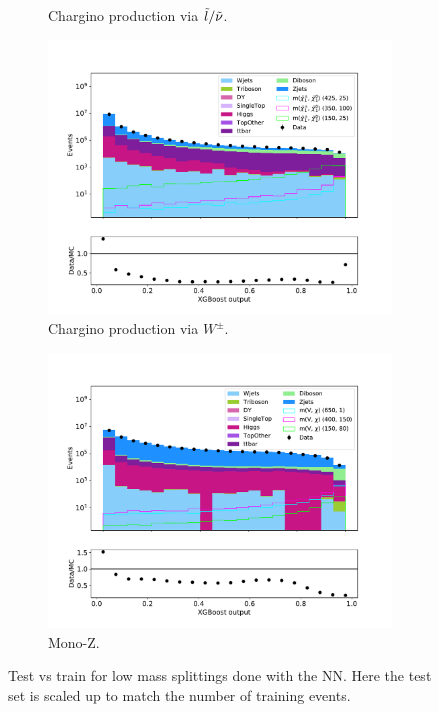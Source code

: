 \begin{figure}[H]
\begin{subfigure}[t!]{0.49\textwidth}
        \caption{Chargino production via $\Tilde{l}/\Tilde{\nu}$.}
        \label{fig:SlepsnuNNLow}
    \end{subfigure}  
    \begin{subfigure}[t!]{0.49\textwidth}
        \includegraphics[width = \textwidth]{Figures/Stacked/stackedplot_BDT_All_level_WW.pdf}
        \caption{Chargino production via $W^\pm$.}
        \label{fig:WWNNLow}
    \end{subfigure}
    \begin{subfigure}[t!]{0.49\textwidth}
        \includegraphics[width = \textwidth]{Figures/Stacked/stackedplot_BDT_All_level_monoZ.pdf}
        \caption{Mono-Z.}
        \label{fig:MonoZNNLow}
    \end{subfigure}
    \caption{Test vs train for low mass splittings done with the NN. Here the test set is scaled up to match the number of training events.}
    \label{fig:AllLowNN}
\end{figure}









